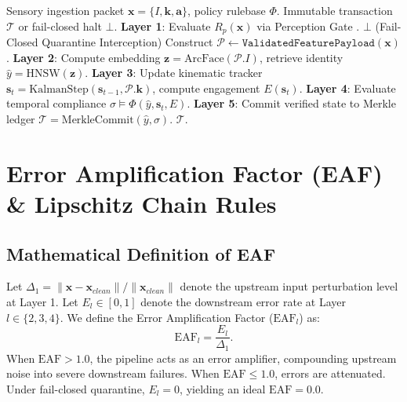 \documentclass[conference]{IEEEtran}
\begin{document}
\begin{algorithm}[t]
\caption{5-Layer Macro Pipeline State Orchestration}
\label{alg:macro_orchestration}
\begin{algorithmic}[1]
\REQUIRE Sensory ingestion packet $\mathbf{x} = \{I, \mathbf{k}, \mathbf{a}\}$, policy rulebase $\Phi$.
\ENSURE Immutable transaction $\mathcal{T}$ or fail-closed halt $\bot$.
\STATE \textbf{Layer 1}: Evaluate $R_p(\mathbf{x})$ via Perception Gate \cite{kumar2026scholar22}.
    \RETURN $\bot$ (Fail-Closed Quarantine Interception)
\ENDIF
\STATE Construct $\mathcal{P} \leftarrow \mathtt{ValidatedFeaturePayload}(\mathbf{x})$.
\STATE \textbf{Layer 2}: Compute embedding $\mathbf{z} = \text{ArcFace}(\mathcal{P}.I)$, retrieve identity $\hat{y} = \text{HNSW}(\mathbf{z})$.
\STATE \textbf{Layer 3}: Update kinematic tracker $\mathbf{s}_t = \text{KalmanStep}(\mathbf{s}_{t-1}, \mathcal{P}.\mathbf{k})$, compute engagement $E(\mathbf{s}_t)$.
\STATE \textbf{Layer 4}: Evaluate temporal compliance $\sigma \models \Phi(\hat{y}, \mathbf{s}_t, E)$.
\STATE \textbf{Layer 5}: Commit verified state to Merkle ledger $\mathcal{T} = \text{MerkleCommit}(\hat{y}, \sigma)$.
\RETURN $\mathcal{T}$.
\end{algorithmic}
\end{algorithm}

\section{Error Amplification Factor (EAF) \& Lipschitz Chain Rules}
\subsection{Mathematical Definition of EAF}
Let $\Delta_1 = \|\mathbf{x} - \mathbf{x}_{clean}\| / \|\mathbf{x}_{clean}\|$ denote the upstream input perturbation level at Layer 1. Let $E_l \in [0, 1]$ denote the downstream error rate at Layer $l \in \{2, 3, 4\}$.
We define the Error Amplification Factor ($\text{EAF}_l$) as:
\begin{equation}
\mathrm{EAF}_l = \frac{E_l}{\Delta_1}.
\end{equation}
When $\mathrm{EAF} > 1.0$, the pipeline acts as an error amplifier, compounding upstream noise into severe downstream failures. When $\mathrm{EAF} \le 1.0$, errors are attenuated. Under fail-closed quarantine, $E_l = 0$, yielding an ideal $\mathrm{EAF} = 0.0$.
\end{document}
